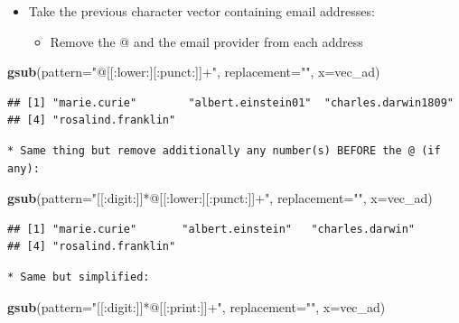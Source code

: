 \documentclass[]{book}
\newenvironment{Shaded}{\begin{snugshade}}{\end{snugshade}}
\newcommand{\DataTypeTok}[1]{\textcolor[rgb]{0.13,0.29,0.53}{#1}}
\newcommand{\KeywordTok}[1]{\textcolor[rgb]{0.13,0.29,0.53}{\textbf{#1}}}
\newcommand{\NormalTok}[1]{#1}
\newcommand{\StringTok}[1]{\textcolor[rgb]{0.31,0.60,0.02}{#1}}
\providecommand{\tightlist}{%
  \setlength{\itemsep}{0pt}\setlength{\parskip}{0pt}}
\begin{document}
\begin{itemize}
\tightlist
\item
  Take the previous character vector containing email addresses:

  \begin{itemize}
  \tightlist
  \item
    Remove the @ and the email provider from each address
  \end{itemize}
\end{itemize}

\begin{Shaded}
\begin{Highlighting}[]
\KeywordTok{gsub}\NormalTok{(}\DataTypeTok{pattern=}\StringTok{"@[[:lower:][:punct:]]+"}\NormalTok{, }
    \DataTypeTok{replacement=}\StringTok{""}\NormalTok{, }
    \DataTypeTok{x=}\NormalTok{vec_ad)}
\end{Highlighting}
\end{Shaded}

\begin{verbatim}
## [1] "marie.curie"        "albert.einstein01"  "charles.darwin1809"
## [4] "rosalind.franklin"
\end{verbatim}

\begin{verbatim}
* Same thing but remove additionally any number(s) BEFORE the @ (if any):
\end{verbatim}

\begin{Shaded}
\begin{Highlighting}[]
\KeywordTok{gsub}\NormalTok{(}\DataTypeTok{pattern=}\StringTok{"[[:digit:]]*@[[:lower:][:punct:]]+"}\NormalTok{,}
        \DataTypeTok{replacement=}\StringTok{""}\NormalTok{,}
        \DataTypeTok{x=}\NormalTok{vec_ad)}
\end{Highlighting}
\end{Shaded}

\begin{verbatim}
## [1] "marie.curie"       "albert.einstein"   "charles.darwin"   
## [4] "rosalind.franklin"
\end{verbatim}

\begin{verbatim}
* Same but simplified:
\end{verbatim}

\begin{Shaded}
\begin{Highlighting}[]
\KeywordTok{gsub}\NormalTok{(}\DataTypeTok{pattern=}\StringTok{"[[:digit:]]*@[[:print:]]+"}\NormalTok{,}
        \DataTypeTok{replacement=}\StringTok{""}\NormalTok{,}
        \DataTypeTok{x=}\NormalTok{vec_ad)}
\end{Highlighting}
\end{Shaded}
\end{document}
